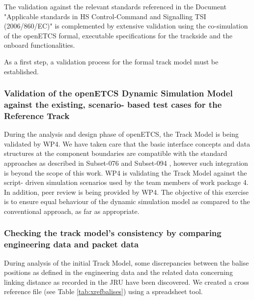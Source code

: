 \documentclass{template/openetcs_article}
\begin{document}
The validation against the relevant standards referenced in the Document "Applicable standards in HS Control-Command and Signalling TSI (2006/860/EC)" \cite{CCS-TSI} is complemented by extensive validation using the co-simulation of the openETCS formal, executable specifications for the trackside and the onboard functionalities. 

As a first step, a validation process for the formal track model must be established. 


\subsubsection{Validation of the openETCS Dynamic Simulation Model against the existing, scenario- based test cases for the Reference Track}

During the analysis and design phase of openETCS, the Track Model is being validated by WP4. We have taken care that the basic interface concepts and data structures at the component boundaries are compatible with the standard approaches as described in Subset-076 \cite{Subset076} and Subset-094 \cite{Subset094}, however such integration is beyond the scope of this work.\newline 
WP4 is validating the Track Model against the script- driven simulation scenarios used by the team members of work package 4. In addition, peer review is being provided by WP4.\newline
The objective of this exercise is to ensure equal behaviour of the dynamic simulation model as compared to the conventional approach, as far as appropriate. 

\subsubsection{Checking the track model's consistency by comparing engineering data and packet data}

During analysis of the initial Track Model, some discrepancies between the balise positions as defined in the engineering data and the related data concerning linking distance as recorded in the JRU have been discovered. We created a cross reference file (see Table \ref{tab:xrefbalises}) using a spreadsheet tool. 
\end{document}

